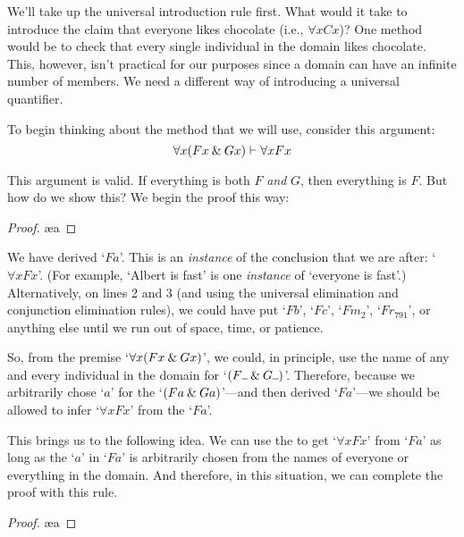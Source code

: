 We'll take up the universal introduction rule first. What would it take to introduce the claim that everyone likes chocolate (i.e., $\forall x Cx$)? One method would be to check that every single individual in the domain likes chocolate. This, however, isn’t practical for our purposes since a domain can have an infinite number of members.
We need a different way of introducing a universal quantifier.

To begin thinking about the method that we will use, consider this argument:
$$\forall x (Fx \mathbin{\&} Gx) \vdash \forall x Fx$$

\noindent This argument is valid. If everything is both $F$ \emph{and} $G$, then everything is $F$.  But how do we show this?  We begin the proof this way:

\begin{proof}
	 \pr{}
	 
	 \ae{a}
\end{proof}
We have derived `$Fa$'. This is an \textit{instance} of the conclusion that we are after: `$\forall xFx$'. (For example, `Albert is fast' is one \textit{instance} of `everyone is fast'.) 
Alternatively, on lines 2 and 3 (and using the universal elimination and conjunction elimination rules), we could have put `$Fb$', `$Fc$', `$Fm_2$', `$Fr_{791}$', or anything else until we run out of space, time, or patience.   

So, from the premise `$\forall x (Fx \mathbin{\&} Gx)$', we could, in principle, use the name of any and every individual in the domain for `$(F\rule{1.7mm}{0.15mm} \eand G\rule{1.7mm}{0.15mm})$'.
Therefore, because we arbitrarily chose `$a$' for the `$(Fa \mathbin{\&} Ga)$'---and then derived `$Fa$'---we should be allowed to infer `$\forall x Fx$' from the `$Fa$'.  

This brings us to the following idea. We can use the  to get `$\forall x Fx$' from `$Fa$' as long as the `$a$' in `$Fa$' is arbitrarily chosen from the names of everyone or everything in the domain. And therefore, in this situation, we can complete the proof with this rule.

\begin{proof}
	 \pr{}
	 
	 \ae{a}
	 
\end{proof}

